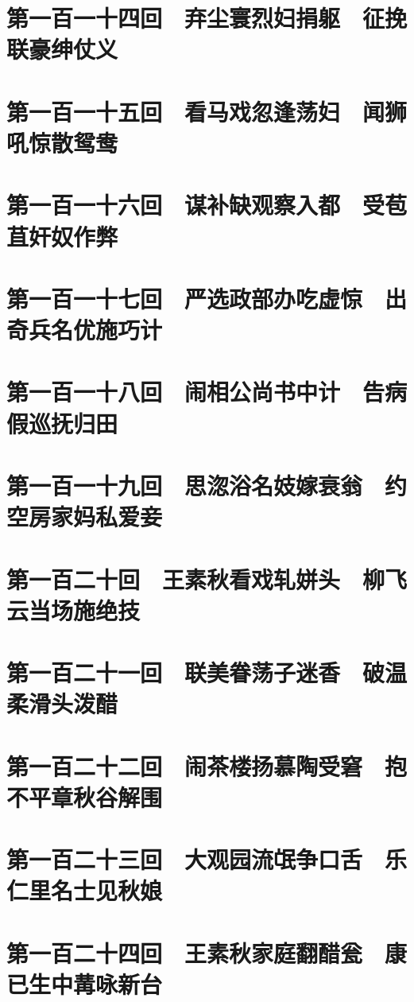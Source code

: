 \documentclass[12pt,UTF8]{ctexbook}
\begin{document}
{\chapter{第一百一十四回　弃尘寰烈妇捐躯　征挽联豪绅仗义}

\chapter{第一百一十五回　看马戏忽逢荡妇　闻狮吼惊散鸳鸯}

\chapter{第一百一十六回　谋补缺观察入都　受苞苴奸奴作弊}

\chapter{第一百一十七回　严选政部办吃虚惊　出奇兵名优施巧计}

\chapter{第一百一十八回　闹相公尚书中计　告病假巡抚归田}
\chapter{第一百一十九回　思淴浴名妓嫁衰翁　约空房家妈私爱妾}

\chapter{第一百二十回　王素秋看戏轧姘头　柳飞云当场施绝技}
\chapter{第一百二十一回　联美眷荡子迷香　破温柔滑头泼醋}

\chapter{第一百二十二回　闹茶楼扬慕陶受窘　抱不平章秋谷解围}

\chapter{第一百二十三回　大观园流氓争口舌　乐仁里名士见秋娘}

\chapter{第一百二十四回　王素秋家庭翻醋瓮　康已生中冓咏新台}

}
\end{document}
